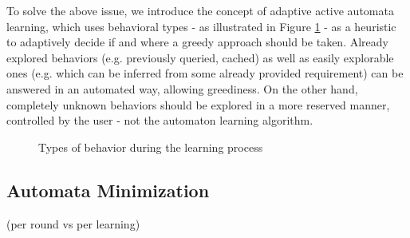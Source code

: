 To solve the above issue, we introduce the concept of adaptive active automata learning, which uses behavioral types - as illustrated in Figure \ref{fig_architcture_commandhandling} - as a heuristic to adaptively decide if and where a greedy approach should be taken. Already explored behaviors (e.g. previously queried, cached) as well as easily explorable ones (e.g. which can be inferred from some already provided requirement)  can be answered in an automated way, allowing greediness. On the other hand, completely unknown behaviors should be explored in a more reserved manner, controlled by the user - not the automaton learning algorithm.

\begin{figure}[!ht] 
	\centering
	\caption{Types of behavior during the learning process} 
	\label{fig_architcture_commandhandling}
\end{figure} %

\subsection{Automata Minimization} \label{subs_minimizationintheframework}
(per round vs per learning)

